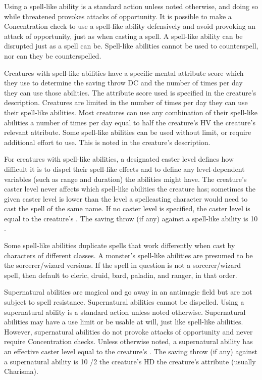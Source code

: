 {Using a spell-like ability is a standard action unless noted otherwise, and doing so while threatened provokes attacks of opportunity. It is possible to make a Concentration check to use a spell-like ability defensively and avoid provoking an attack of opportunity, just as when casting a spell. A spell-like ability can be disrupted just as a spell can be. Spell-like abilities cannot be used to counterspell, nor can they be counterspelled.

Creatures with spell-like abilities have a specific mental attribute score which they use to determine the saving throw DC and the number of times per day they can use those abilities. The attribute score used is specified in the creature's description. Creatures are limited in the number of times per day they can use their spell-like abilities. Most creatures can use any combination of their spell-like abilities a number of times per day equal to half the creature's HV \add the creature's relevant attribute. Some spell-like abilities can be used without limit, or require additional effort to use. This is noted in the creature's description.

For creatures with spell-like abilities, a designated caster level defines how difficult it is to dispel their spell-like effects and to define any level-dependent variables (such as range and duration) the abilities might have. The creature's caster level never affects which spell-like abilities the creature has; sometimes the given caster level is lower than the level a spellcasting character would need to cast the spell of the same name. If no caster level is specified, the caster level is equal to the creature's . The saving throw (if any) against a spell-like ability is 10 \add {} \add {}.

Some spell-like abilities duplicate spells that work differently when cast by characters of different classes. A monster's spell-like abilities are presumed to be the sorcerer/wizard versions. If the spell in question is not a sorcerer/wizard spell, then default to cleric, druid, bard, paladin, and ranger, in that order.

 Supernatural abilities are magical and go away in an antimagic field but are not subject to spell resistance. Supernatural abilities cannot be dispelled. Using a supernatural ability is a standard action unless noted otherwise. Supernatural abilities may have a use limit or be usable at will, just like spell-like abilities. However, supernatural abilities do not provoke attacks of opportunity and never require Concentration checks. Unless otherwise noted, a supernatural ability has an effective caster level equal to the creature's . The saving throw (if any) against a supernatural ability is 10 /2 the creature's HD \add the creature's attribute (usually Charisma).

}
